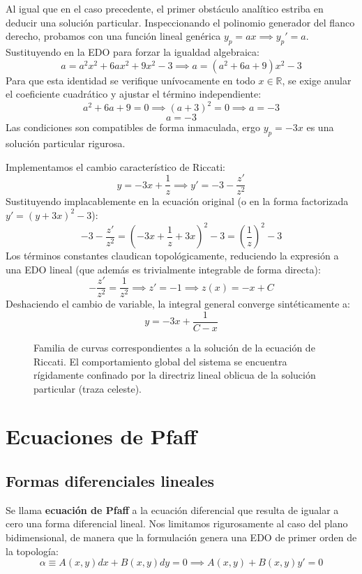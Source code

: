 \begin{tcolorbox}
Al igual que en el caso precedente, el primer obstáculo analítico estriba en deducir una solución particular. Inspeccionando el polinomio generador del flanco derecho, probamos con una función lineal genérica $y_p = ax \implies y_p' = a$.
Sustituyendo en la EDO para forzar la igualdad algebraica:
$$ a = a^2 x^2 + 6ax^2 + 9x^2 - 3 \implies a = (a^2 + 6a + 9)x^2 - 3 $$
Para que esta identidad se verifique unívocamente en todo $x \in \mathbb{R}$, se exige anular el coeficiente cuadrático y ajustar el término independiente:
$$ a^2 + 6a + 9 = 0 \implies (a+3)^2 = 0 \implies a = -3 $$
$$ a = -3 $$
Las condiciones son compatibles de forma inmaculada, ergo $y_p = -3x$ es una solución particular rigurosa.

Implementamos el cambio característico de Riccati:
$$ y = -3x + \frac{1}{z} \implies y' = -3 - \frac{z'}{z^2} $$
Sustituyendo implacablemente en la ecuación original (o en la forma factorizada $y' = (y+3x)^2 - 3$):
$$ -3 - \frac{z'}{z^2} = \left( -3x + \frac{1}{z} + 3x \right)^2 - 3 = \left(\frac{1}{z}\right)^2 - 3 $$
Los términos constantes claudican topológicamente, reduciendo la expresión a una EDO lineal (que además es trivialmente integrable de forma directa):
$$ -\frac{z'}{z^2} = \frac{1}{z^2} \implies z' = -1 \implies z(x) = -x + C $$
Deshaciendo el cambio de variable, la integral general converge sintéticamente a:
$$ y = -3x + \frac{1}{C - x} $$

\begin{figure}[H]
    \centering
    
    \caption{Familia de curvas correspondientes a la solución de la ecuación de Riccati. El comportamiento global del sistema se encuentra rígidamente confinado por la directriz lineal oblicua de la solución particular (traza celeste).}
\end{figure}
\end{tcolorbox}
\newpage

\section{Ecuaciones de Pfaff}

\subsection{Formas diferenciales lineales}

\begin{definicion}
Se llama \textbf{ecuación de Pfaff} a la ecuación diferencial que resulta de igualar a cero una forma diferencial lineal. Nos limitamos rigurosamente al caso del plano bidimensional, de manera que la formulación genera una EDO de primer orden de la topología:
$$ \alpha \equiv A(x,y)dx + B(x,y)dy = 0 \implies A(x,y) + B(x,y)y' = 0 $$
\end{definicion}

